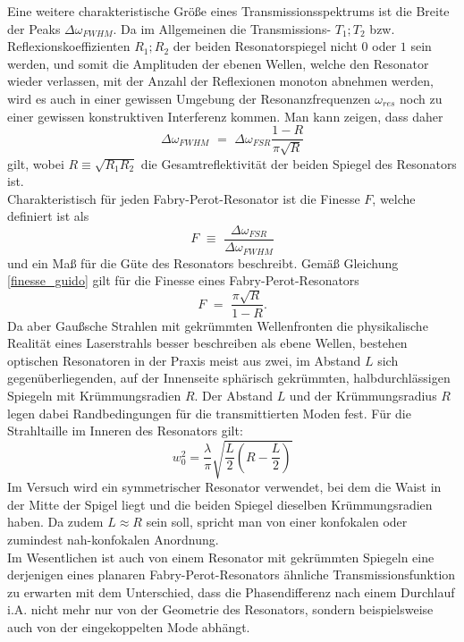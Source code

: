 \documentclass[11pt,a4paper,oneside]{scrartcl}
\begin{document}
 Eine weitere charakteristische Größe eines Transmissionsspektrums ist die Breite der Peaks $ \Delta \omega_{FWHM}$. Da im Allgemeinen die Transmissions- $T_1;T_2$ bzw. Reflexionskoeffizienten $R_1;R_2$ der beiden Resonatorspiegel nicht $0$ oder $1$ sein werden, und somit die Amplituden der ebenen Wellen, welche den Resonator wieder verlassen, mit der Anzahl der Reflexionen monoton abnehmen werden, wird es auch in einer gewissen Umgebung der Resonanzfrequenzen $\omega_{res}$ noch zu einer gewissen konstruktiven Interferenz kommen. Man kann zeigen, dass daher 
\begin{equation}\label{finesse_guido}
\Delta \omega_{FWHM} \,\,=\,\, \Delta \omega_{FSR} \frac{1-R}{\pi \sqrt{R}}
\end{equation}
gilt, 
wobei $R\equiv\sqrt{R_1 R_2}$ die Gesamtreflektivität der beiden Spiegel des Resonators ist.\\
Charakteristisch für jeden Fabry-Perot-Resonator ist die Finesse $F$, welche definiert ist als
\begin{equation}
F \,\,\equiv\,\, \frac{\Delta \omega_{FSR}}{\Delta \omega_{FWHM}}
\end{equation}
und ein Maß für die Güte des Resonators beschreibt. Gemäß Gleichung \ref{finesse_guido} gilt für die Finesse eines Fabry-Perot-Resonators
\begin{equation}\label{finesse_theor}
F \,\,=\,\, \frac{\pi\sqrt{R}}{1-R}.
\end{equation}
Da aber Gaußsche Strahlen mit gekrümmten Wellenfronten die physikalische Realität eines Laserstrahls besser beschreiben als ebene Wellen, bestehen optischen Resonatoren in der Praxis meist aus zwei, im Abstand $L$ sich gegenüberliegenden, auf der Innenseite sphärisch gekrümmten, halbdurchlässigen Spiegeln mit Krümmungsradien $R$. Der Abstand $L$ und der Krümmungsradius $R$ legen dabei Randbedingungen für die transmittierten Moden fest.
Für die Strahltaille im Inneren des Resonators gilt:
\begin{equation}
w_0^2=\frac{\lambda}{\pi}\sqrt{\frac{L}{2}\left(R-\frac{L}{2}\right)}
\end{equation}
Im Versuch wird ein symmetrischer Resonator verwendet, bei dem die Waist in der Mitte der Spigel liegt und die beiden Spiegel dieselben Krümmungsradien haben. Da zudem $L\approx R$ sein soll, spricht man von einer konfokalen oder zumindest nah-konfokalen Anordnung.\\
Im Wesentlichen ist auch von einem Resonator mit gekrümmten Spiegeln eine derjenigen eines planaren Fabry-Perot-Resonators ähnliche Transmissionsfunktion zu erwarten mit dem Unterschied, dass die Phasendifferenz nach einem Durchlauf i.A. nicht mehr nur von der Geometrie des Resonators, sondern beispielsweise auch von der eingekoppelten Mode abhängt.
\end{document}
